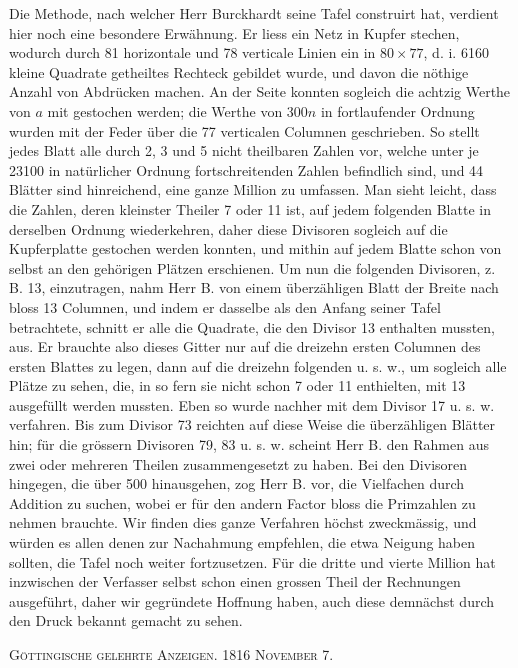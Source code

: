 \documentclass[12pt]{article}
\begin{document}
Die Methode, nach welcher Herr Burckhardt seine Tafel construirt hat, verdient hier noch eine besondere Erwähnung. Er liess ein Netz in Kupfer stechen, wodurch durch 81 horizontale und 78 verticale Linien ein in $80\times77$, d. i. 6160 kleine Quadrate getheiltes Rechteck gebildet wurde, und davon die nöthige Anzahl von Abdrücken machen. An der Seite konnten sogleich die achtzig Werthe von $a$ mit gestochen werden; die Werthe von $300n$ in fortlaufender Ordnung wurden mit der Feder über die 77 verticalen Columnen geschrieben. So stellt jedes Blatt alle durch 2, 3 und 5 nicht theilbaren Zahlen vor, welche unter je 23100 in natürlicher Ordnung fortschreitenden Zahlen befindlich sind, und 44 Blätter sind hinreichend, eine ganze Million zu umfassen. Man sieht leicht, dass die Zahlen, deren kleinster Theiler 7 oder 11 ist, auf jedem folgenden Blatte in derselben Ordnung wiederkehren, daher diese Divisoren sogleich auf die Kupferplatte gestochen werden konnten, und mithin auf jedem Blatte schon von selbst an den gehörigen Plätzen erschienen. Um nun die folgenden Divisoren, z. B. 13, einzutragen, nahm Herr B. von einem überzähligen Blatt der Breite nach bloss 13 Columnen, und indem er dasselbe als den Anfang seiner Tafel betrachtete, schnitt er alle die Quadrate, die den Divisor 13 enthalten mussten, aus. Er brauchte also dieses Gitter nur auf die dreizehn ersten Columnen des ersten Blattes zu legen, dann auf die dreizehn folgenden u. s. w., um sogleich alle Plätze zu sehen, die, in so fern sie nicht schon 7 oder 11 enthielten, mit 13 ausgefüllt werden mussten. Eben so wurde nachher mit dem Divisor 17 u. s. w. verfahren. Bis zum Divisor 73 reichten auf diese Weise die überzähligen Blätter hin; für die grössern Divisoren 79, 83 u. s. w. scheint Herr B. den Rahmen aus zwei oder mehreren Theilen zusammengesetzt zu haben. Bei den Divisoren hingegen, die über 500 hinausgehen, zog Herr B. vor, die Vielfachen durch Addition zu suchen, wobei er für den andern Factor bloss die Primzahlen zu nehmen brauchte. Wir finden dies ganze Verfahren höchst zweckmässig, und würden es allen denen zur Nachahmung empfehlen, die etwa Neigung haben sollten, die Tafel noch weiter fortzusetzen. Für die dritte und vierte Million hat inzwischen der Verfasser selbst schon einen grossen Theil der Rechnungen ausgeführt, daher wir gegründete Hoffnung haben, auch diese demnächst durch den Druck bekannt gemacht zu sehen.

\begin{center}
\textsc{Göttingische gelehrte Anzeigen. 1816 November 7.}
\end{center}
\end{document}
